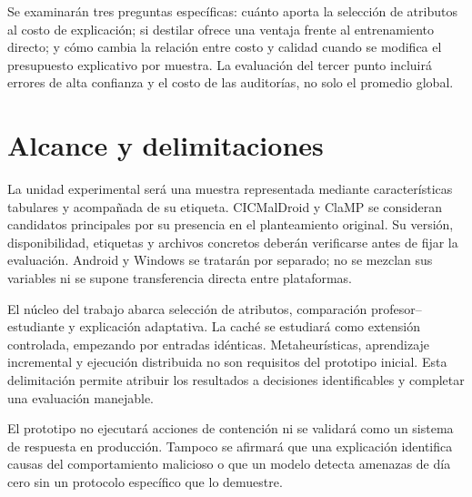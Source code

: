 Se examinarán tres preguntas específicas: cuánto aporta la selección de atributos al costo de explicación; si destilar ofrece una ventaja frente al entrenamiento directo; y cómo cambia la relación entre costo y calidad cuando se modifica el presupuesto explicativo por muestra. La evaluación del tercer punto incluirá errores de alta confianza y el costo de las auditorías, no solo el promedio global.

\section{Alcance y delimitaciones}
La unidad experimental será una muestra representada mediante características tabulares y acompañada de su etiqueta. CICMalDroid y ClaMP se consideran candidatos principales por su presencia en el planteamiento original. Su versión, disponibilidad, etiquetas y archivos concretos deberán verificarse antes de fijar la evaluación. Android y Windows se tratarán por separado; no se mezclan sus variables ni se supone transferencia directa entre plataformas.

El núcleo del trabajo abarca selección de atributos, comparación profesor--estudiante y explicación adaptativa. La caché se estudiará como extensión controlada, empezando por entradas idénticas. Metaheurísticas, aprendizaje incremental y ejecución distribuida no son requisitos del prototipo inicial. Esta delimitación permite atribuir los resultados a decisiones identificables y completar una evaluación manejable.

El prototipo no ejecutará acciones de contención ni se validará como un sistema de respuesta en producción. Tampoco se afirmará que una explicación identifica causas del comportamiento malicioso o que un modelo detecta amenazas de día cero sin un protocolo específico que lo demuestre.
